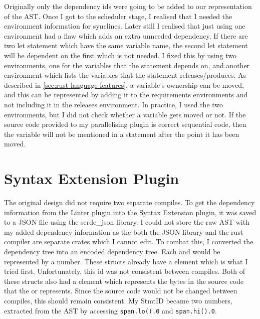 Originally only the dependency ids were going to be added to our representation of the AST. Once I got to the scheduler stage, I realised that I needed the environment information for synclines. Later still I realised that just using one environment had a flaw which adds an extra unneeded dependency. If there are two let statement which have the same variable name, the second let statement will be dependent on the first which is not needed. I fixed this by using two environments, one for the variables that the statement depends on, and another environment which lists the variables that the statement releases/produces. As described in \autoref{sec:rust-language-features}, a variable's ownership can be moved, and this can be represented by adding it to the requirements environments and not including it in the releases environment. In practice, I used the two environments, but I did not check whether a variable gets moved or not. If the source code provided to my parallelising plugin is correct sequential code, then the variable will not be mentioned in a statement after the point it has been moved.

\section{Syntax Extension Plugin}
The original design did not require two separate compiles. To get the dependency information from the Linter plugin into the Syntax Extension plugin, it was saved to a JSON file using the serde\_json library. I could not store the raw AST with my added dependency information as the both the JSON library and the rust compiler are separate crates which I cannot edit. To combat this, I converted the dependency tree into an encoded dependency tree. Each  and  would be represented by a number. These structs already have a  element which is what I tried first. Unfortunately, this id was not consistent between compiles. Both of these structs also had a  element which represents the bytes in the source code that the  or  represents. Since the source code would not be changed between compiles, this should remain consistent. My StmtID became two numbers, extracted from the AST by accessing \texttt{span.lo().0} and \texttt{span.hi().0}.

